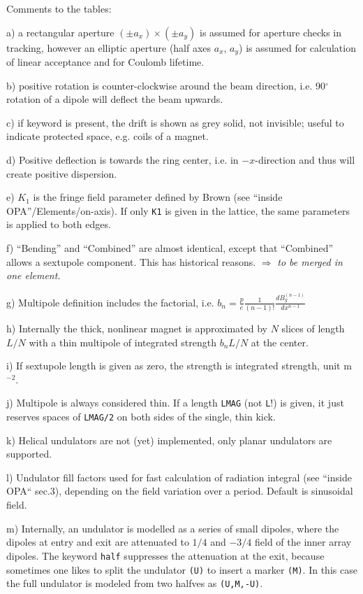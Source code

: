 \documentclass[12pt]{article}
\newcommand{\degree}{\mbox{$^{\circ}$}}
\newcommand\todo[1]{$\Longrightarrow$ {\em #1} }
\begin{document}
Comments to the tables:

a) a rectangular aperture $(\pm a_x)\times(\pm a_y)$ is assumed for aperture checks in tracking, however an elliptic aperture (half axes $a_x$, $a_y$) is assumed for calculation of linear acceptance and for Coulomb lifetime.

b) positive rotation is counter-clockwise around the beam direction, i.e. 90\degree rotation of a dipole will deflect the beam upwards.

c) if keyword is present, the drift is shown as grey solid, not invisible; useful to indicate protected space, e.g. coils of a magnet.

d) Positive deflection is towards the ring center, i.e. in $-x$-direction and thus will create positive dispersion.

e) $K_1$ is the fringe field parameter defined by Brown (see ``inside OPA''/Elements/on-axis). If only {\tt K1} is given in the lattice, the same parameters is applied to both edges. 

f) ``Bending'' and ``Combined'' are almost identical, except that ``Combined'' allows a sextupole component. This has historical reasons. \todo{to be merged in one element.}

g) Multipole definition includes the factorial, i.e. $b_n = \frac{p}{e}\frac{1}{(n-1)!}\frac{d B^{(n-1)}_y}{d x^{n-1}}$

h) Internally the thick, nonlinear magnet is approximated by $N$ slices of length $L/N$ with a thin multipole of integrated strength $b_nL/N$ at the center.

i) If sextupole length is given as zero, the strength is integrated strength, unit m$^{-2}$.

j) Multipole is always considered thin. If a length {\tt LMAG} (not {\tt L}!) is given, it just reserves spaces of {\tt LMAG/2} on both sides of the single, thin kick.

k) Helical undulators are not (yet) implemented, only planar undulators are supported.

l) Undulator fill factors used for fast calculation of radiation integral (see ``inside OPA`` sec.3), depending on the field variation over a period. Default is sinusoidal field. 

m) Internally, an undulator is modelled as a series of small dipoles, where the dipoles at entry and exit are attenuated to $1/4$ and $-3/4$ field of the inner array dipoles. The keyword {\tt half} suppresses the attenuation at the exit, because sometimes one likes to split the undulator {\tt(U)} to insert a marker {\tt(M)}. In this case the full undulator is modeled from two halfves as {\tt(U,M,-U)}.
\end{document}
